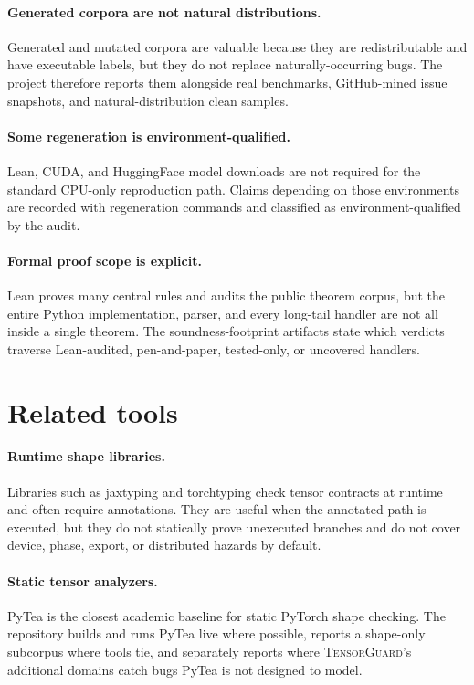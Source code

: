 \documentclass[11pt]{article}
\newcommand{\tg}{\textsc{TensorGuard}}
\begin{document}
\paragraph{Generated corpora are not natural distributions.}
Generated and mutated corpora are valuable because they are redistributable and
have executable labels, but they do not replace naturally-occurring bugs.  The
project therefore reports them alongside real benchmarks, GitHub-mined issue
snapshots, and natural-distribution clean samples.

\paragraph{Some regeneration is environment-qualified.}
Lean, CUDA, and HuggingFace model downloads are not required for the standard
CPU-only reproduction path.  Claims depending on those environments are
recorded with regeneration commands and classified as environment-qualified by
the audit.

\paragraph{Formal proof scope is explicit.}
Lean proves many central rules and audits the public theorem corpus, but the
entire Python implementation, parser, and every long-tail handler are not all
inside a single theorem.  The soundness-footprint artifacts state which verdicts
traverse Lean-audited, pen-and-paper, tested-only, or uncovered handlers.

\section{Related tools}

\paragraph{Runtime shape libraries.}
Libraries such as jaxtyping and torchtyping check tensor contracts at runtime
and often require annotations.  They are useful when the annotated path is
executed, but they do not statically prove unexecuted branches and do not cover
device, phase, export, or distributed hazards by default.

\paragraph{Static tensor analyzers.}
PyTea is the closest academic baseline for static PyTorch shape checking.  The
repository builds and runs PyTea live where possible, reports a shape-only
subcorpus where tools tie, and separately reports where \tg{}'s additional
domains catch bugs PyTea is not designed to model.
\end{document}
